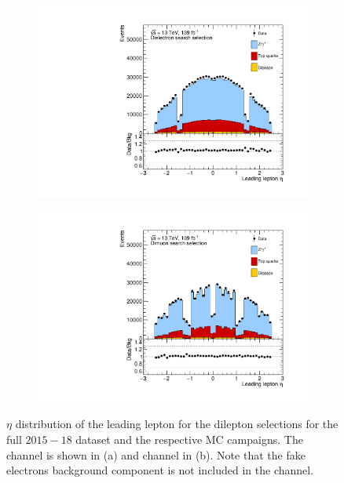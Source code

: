 \begin{figure}[]
    \centering
    \begin{subfigure}[b]{0.49\textwidth}
        \centering
        \includegraphics[width=\textwidth]{figures/analysis/datamc/dataMCcompare/ee_eta1.pdf}
        \caption{}
        \label{fig:datamc:eeeta1}
    \end{subfigure}
    \begin{subfigure}[b]{0.49\textwidth}
        \centering
        \includegraphics[width=\textwidth]{figures/analysis/datamc/dataMCcompare/uu_eta1.pdf}
        \caption{}
        \label{fig:datamc:uueta1}
    \end{subfigure}
    \caption[$\eta$ distribution of the leading lepton for the dilepton selections for the full $2015-18$ dataset and the respective MC campaigns.]{$\eta$ distribution of the leading lepton for the dilepton selections for the full $2015-18$ dataset and the respective MC campaigns. The \ee channel is shown in (a) and \mumu channel in (b). Note that the fake electrons background component is not included in the \ee channel.}
    \label{fig:datamc:eta1}
\end{figure}

